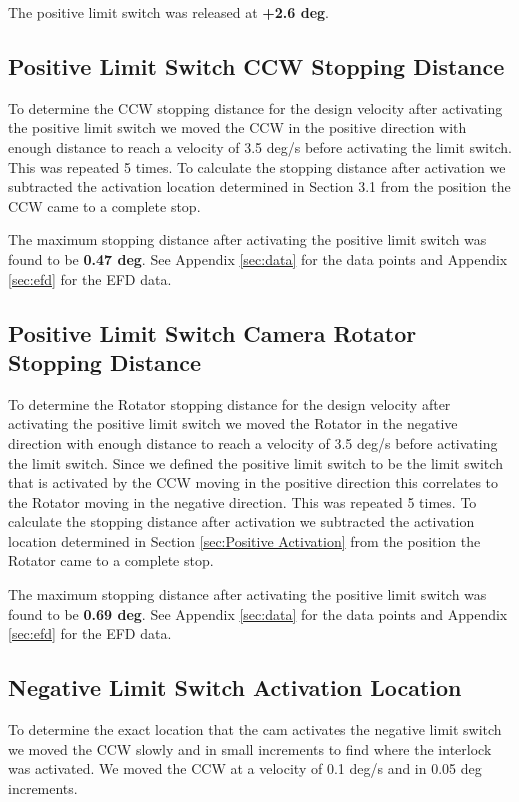\documentclass[SE,authoryear,toc, lsstdraft]{lsstdoc}
\begin{document}
The positive limit switch was released at \textbf{+2.6 deg}.

\subsection{Positive Limit Switch CCW Stopping Distance}

To determine the CCW stopping distance for the design velocity after
activating the positive limit switch we moved the CCW in the positive
direction with enough distance to reach a velocity of 3.5 deg/s before
activating the limit switch. This was repeated 5 times. To
calculate the stopping distance after activation we subtracted the
activation location determined in Section 3.1 from the position the CCW
came to a complete stop.

The maximum stopping distance after activating the positive limit switch
was found to be \textbf{0.47 deg}. See Appendix \ref{sec:data} for the data points
and Appendix \ref{sec:efd} for the EFD data.

\subsection{Positive Limit Switch Camera Rotator Stopping Distance}

To determine the Rotator stopping distance for the design velocity after
activating the positive limit switch we moved the Rotator in the
negative direction with enough distance to reach a velocity of 3.5 deg/s
before activating the limit switch. Since we defined the positive limit
switch to be the limit switch that is activated by the CCW moving in the
positive direction this correlates to the Rotator moving in the negative
direction. This was repeated 5 times. To calculate the stopping
distance after activation we subtracted the activation location
determined in Section \ref{sec:Positive Activation} from the position the Rotator came to a
complete stop.

The maximum stopping distance after activating the positive limit switch
was found to be \textbf{0.69 deg}. See Appendix \ref{sec:data} for the data points
and Appendix \ref{sec:efd} for the EFD data.

\subsection{Negative Limit Switch Activation Location}\label{sec:Negative Activation}

To determine the exact location that the cam activates the negative
limit switch we moved the CCW slowly and in small increments to find
where the interlock was activated. We moved the CCW at a velocity of 0.1
deg/s and in 0.05 deg increments.
\end{document}
